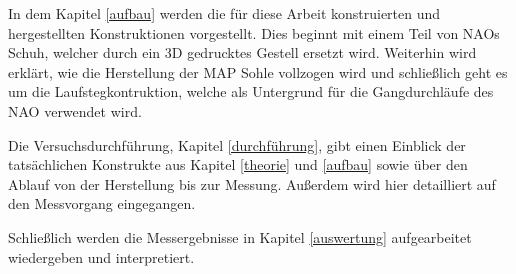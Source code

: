 In dem Kapitel \ref{aufbau} werden die für diese Arbeit konstruierten und hergestellten Konstruktionen vorgestellt. Dies beginnt mit einem Teil von NAOs Schuh, welcher durch ein 3D gedrucktes Gestell ersetzt wird. Weiterhin wird erklärt, wie die Herstellung der MAP Sohle vollzogen wird und schließlich geht es um die Laufstegkontruktion, welche als Untergrund für die Gangdurchläufe des NAO verwendet wird. 

Die Versuchsdurchführung, Kapitel \ref{durchführung}, gibt einen Einblick der tatsächlichen Konstrukte aus Kapitel \ref{theorie} und \ref{aufbau} sowie über den Ablauf von der Herstellung bis zur Messung. Außerdem wird hier detailliert auf den Messvorgang eingegangen. 

Schließlich werden die Messergebnisse in Kapitel \ref{auswertung} aufgearbeitet wiedergeben und interpretiert. 



